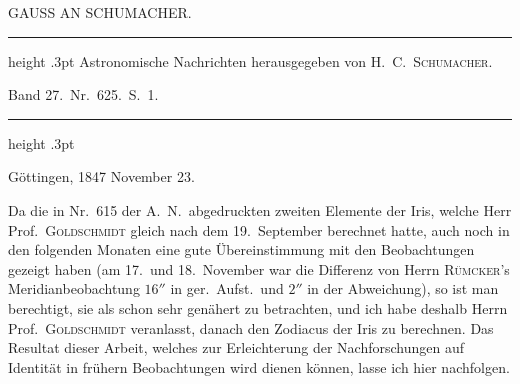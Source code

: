 \clearpage
\thispagestyle{empty}
%
\vspace*{2\baselineskip}
\begin{center}\large GAUSS AN SCHUMACHER.\end{center}
\begin{center}\parbox{.75\linewidth}{\centering\fontsize{8.2}{10.2}\selectfont\frenchspacing
\hrule height .3pt\relax\vspace{2.5pt}
Astronomische Nachrichten herausgegeben von H.\ C.\ \textsc{Schumacher}.\par
Band 27.\ Nr.\ 625.\ S.\ 1.\par
\vspace{2.5pt}\hrule height .3pt\relax
}\end{center}
\begin{flushright}Göttingen, 1847 November 23.\end{flushright}
\par\indent Da die in Nr.\ 615 der A.\ N.\ abgedruckten zweiten Elemente der Iris, welche Herr Prof.\ \textsc{Goldschmidt} gleich nach dem 19.\ September berechnet hatte, auch noch in den folgenden Monaten eine gute Übereinstimmung mit den Beobachtungen gezeigt haben (am 17.\ und 18.\ November war die Differenz von Herrn \textsc{Rümcker}'s Meridianbeobachtung $16''$ in ger.\ Aufst.\ und $2''$ in der Abweichung), so ist man berechtigt, sie als schon sehr genähert zu betrachten, und ich habe deshalb Herrn Prof.\ \textsc{Goldschmidt} veranlasst, danach den Zodiacus der Iris zu berechnen. Das Resultat dieser Arbeit, welches zur Erleichterung der Nachforschungen auf Identität in frühern Beobachtungen wird dienen können, lasse ich hier nachfolgen.

